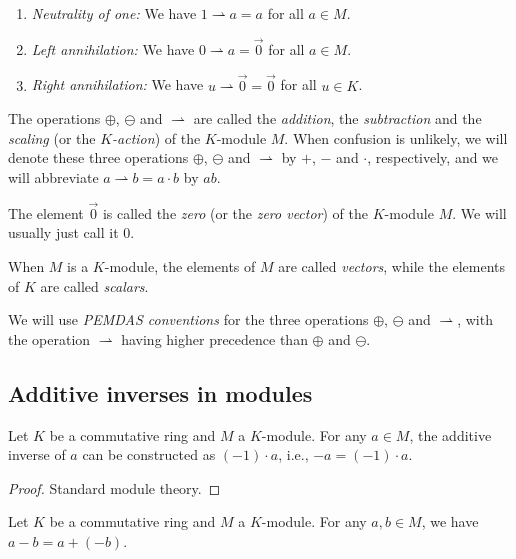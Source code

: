 \begin{definition}
\begin{enumerate}
\item \emph{Neutrality of one:} We have $1\rightharpoonup a=a$ for all $a\in
M$.

\item \emph{Left annihilation:} We have $0\rightharpoonup a=\overrightarrow{0}%
$ for all $a\in M$.

\item \emph{Right annihilation:} We have $u\rightharpoonup\overrightarrow{0}%
=\overrightarrow{0}$ for all $u\in K$.
\end{enumerate}

The operations $\oplus$, $\ominus$ and $\rightharpoonup$ are called the
\emph{addition}, the \emph{subtraction} and the \emph{scaling} (or the
$K$\emph{-action}) of the $K$-module $M$. When confusion is unlikely, we will
denote these three operations $\oplus$, $\ominus$ and $\rightharpoonup$ by
$+$, $-$ and $\cdot$, respectively, and we will abbreviate $a\rightharpoonup
b=a\cdot b$ by $ab$.

The element $\overrightarrow{0}$ is called the \emph{zero} (or the \emph{zero
vector}) of the $K$-module $M$. We will usually just call it $0$.

When $M$ is a $K$-module, the elements of $M$ are called \emph{vectors}, while
the elements of $K$ are called \emph{scalars}.

We will use \emph{PEMDAS conventions} for the three operations $\oplus$,
$\ominus$ and $\rightharpoonup$, with the operation $\rightharpoonup$ having
higher precedence than $\oplus$ and $\ominus$.
\end{definition}

\subsection{Additive inverses in modules}

\begin{lemma}
\label{lem.module.neg-one-smul}
\leanhelper
\leanok
Let $K$ be a commutative ring and $M$ a $K$-module. For any $a\in M$,
the additive inverse of $a$ can be constructed as $(-1)\cdot a$, i.e.,
$-a = (-1)\cdot a$.
\end{lemma}

\begin{proof}
\leanok
Standard module theory.
\end{proof}

\begin{lemma}
\label{lem.module.sub-eq-add-neg}
\leanhelper
\leanok
Let $K$ be a commutative ring and $M$ a $K$-module. For any $a,b\in M$,
we have $a - b = a + (-b)$.
\end{lemma}

